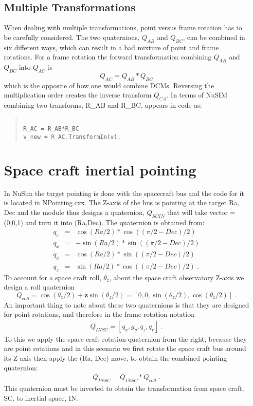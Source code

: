 \documentclass[11pt]{article}
\begin{document}
\subsection{Multiple Transformations}
When dealing with multiple transformations, point versus frame rotation has to be carefully considered. The two quaternions, $Q_{AB}$ and $Q_{BC}$, can be combined in six different ways, which can result in a bad mixture of point and frame rotations. For a frame rotation the forward transformation combining $Q_{AB}$ and $Q_{BC}$ into $Q_{AC}$ is
\begin{equation}
Q_{AC} = Q_{AB}*Q_{BC}
\end{equation} 
which is the opposite of how one would combine DCMs. Reversing the multiplication order creates the inverse transform $Q_{CA}$. In terms of NuSIM combining two transforms, R\_AB and R\_BC, appears in code as:
\begin{quotation}
\begin{verbatim}

R_AC = R_AB*R_BC
v_new = R_AC.TransformIn(v).
\end{verbatim}
\end{quotation} 

\section{Space craft inertial pointing}
In NuSim the target pointing is done with the spacecraft bus and the code for it is located in NPointing.cxx. The Z-axis of the bus is pointing at the target Ra, Dec and the module thus designs a quaternion, $Q_{SCIN}$ that will take vector = (0,0,1) and turn it into (Ra,Dec). The quaternion is obtained from:
\begin{eqnarray}
q_r &=& \cos(Ra/2)*\cos((\pi/2-Dec)/2) \\
q_x &=& -\sin(Ra/2)*\sin((\pi/2-Dec)/2) \\
q_y &=& \cos(Ra/2)*\sin((\pi/2-Dec)/2) \\
q_z &=& \sin(Ra/2)*\cos((\pi/2-Dec)/2) \;.
\end{eqnarray}
To account for a space craft roll, $\theta_z$, about the space craft observatory Z-axis we design a roll quaternion
\begin{equation}
Q_{roll} = \cos(\theta_z/2)+\mathbf{z}\sin(\theta_z/2)=[0,0,\sin(\theta_z/2),\cos(\theta_z/2)] \;.
\end{equation}
An important thing to note about these two quaternions is that they are designed for point rotations, and therefore in the frame rotation notation
\begin{eqnarray}
Q_{INSC} = [q_x,g_y,q_z,q_r] \;.
\end{eqnarray}
To this we apply the space craft rotation quaternion from the right, because they are point rotations and in this scenario we first rotate the space craft bus around its Z-axis then apply the (Ra, Dec) move, to obtain the combined pointing quaternion:
\begin{eqnarray}
Q_{INSC} = Q_{INSC} * Q_{roll}\;.
\end{eqnarray}
This quaternion must be inverted to obtain the transformation from space craft, SC, to inertial space, IN.
\end{document}
